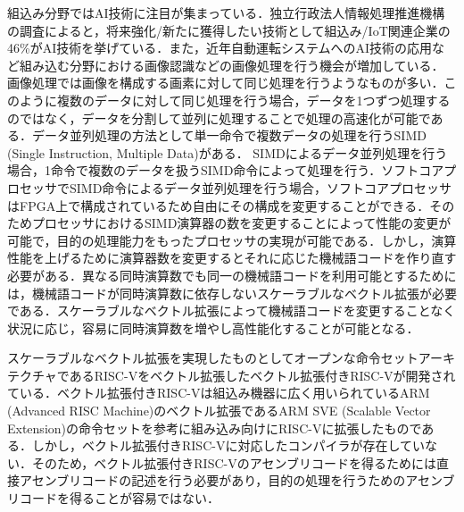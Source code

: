 組込み分野ではAI技術に注目が集まっている．独立行政法人情報処理推進機構の調査によると，将来強化/新たに獲得したい技術として組込み/IoT関連企業の46\%がAI技術を挙げている\cite{bib:ipa}．また，近年自動運転システムへのAI技術の応用\cite{bib:jidou_unten}など組み込む分野における画像認識などの画像処理を行う機会が増加している．
画像処理では画像を構成する画素に対して同じ処理を行うようなものが多い．このように複数のデータに対して同じ処理を行う場合，データを1つずつ処理するのではなく，データを分割して並列に処理することで処理の高速化が可能である．データ並列処理の方法として単一命令で複数データの処理を行うSIMD (Single Instruction, Multiple Data)がある\cite{bib:simd_mimd}．
SIMDによるデータ並列処理を行う場合，1命令で複数のデータを扱うSIMD命令によって処理を行う．ソフトコアプロセッサでSIMD命令によるデータ並列処理を行う場合，ソフトコアプロセッサはFPGA上で構成されているため自由にその構成を変更することができる．そのためプロセッサにおけるSIMD演算器の数を変更することによって性能の変更が可能で，目的の処理能力をもったプロセッサの実現が可能である．しかし，演算性能を上げるために演算器数を変更するとそれに応じた機械語コードを作り直す必要がある．異なる同時演算数でも同一の機械語コードを利用可能とするためには，機械語コードが同時演算数に依存しないスケーラブルなベクトル拡張が必要である．スケーラブルなベクトル拡張によって機械語コードを変更することなく状況に応じ，容易に同時演算数を増やし高性能化することが可能となる．

スケーラブルなベクトル拡張を実現したものとしてオープンな命令セットアーキテクチャであるRISC-V\cite{bib:risc-v}をベクトル拡張したベクトル拡張付きRISC-Vが開発されている\cite{bib:kimura}．ベクトル拡張付きRISC-Vは組込み機器に広く用いられているARM (Advanced RISC Machine)のベクトル拡張であるARM SVE (Scalable Vector Extension)\cite{bib:arm_sve}の命令セットを参考に組み込み向けにRISC-Vに拡張したものである．しかし，ベクトル拡張付きRISC-Vに対応したコンパイラが存在していない．そのため，ベクトル拡張付きRISC-Vのアセンブリコードを得るためには直接アセンブリコードの記述を行う必要があり，目的の処理を行うためのアセンブリコードを得ることが容易ではない．

